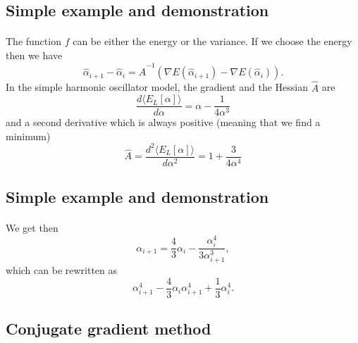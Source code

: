 \documentclass[%
twoside,                 %
final,                   %
10pt]{article}
\begin{document}
\subsection*{Simple example and demonstration}

\paragraph{}
The function $f$ can be either the energy or the variance.  If we choose the energy then we have
\begin{equation*}
\hat{\alpha}_{i+1}-\hat{\alpha}_i=\hat{A}^{-1}(\nabla E(\hat{\alpha}_{i+1})-\nabla E(\hat{\alpha}_i)).
\end{equation*}
In the simple harmonic oscillator model, the gradient and the Hessian $\hat{A}$ are
\begin{equation*}
\frac{d\langle  E_L[\alpha]\rangle}{d\alpha} = \alpha-\frac{1}{4\alpha^3}
\end{equation*}
and a second derivative which is always positive (meaning that we find a minimum)
\begin{equation*}
\hat{A}= \frac{d^2\langle  E_L[\alpha]\rangle}{d\alpha^2} = 1+\frac{3}{4\alpha^4}
\end{equation*}



\subsection*{Simple example and demonstration}

\paragraph{}
We get then
\begin{equation*}
\alpha_{i+1}=\frac{4}{3}\alpha_i-\frac{\alpha_i^4}{3\alpha_{i+1}^3},
\end{equation*}
which can be rewritten as
\begin{equation*}
\alpha_{i+1}^4-\frac{4}{3}\alpha_i\alpha_{i+1}^4+\frac{1}{3}\alpha_i^4.
\end{equation*}



\subsection*{Conjugate gradient method}
\end{document}
